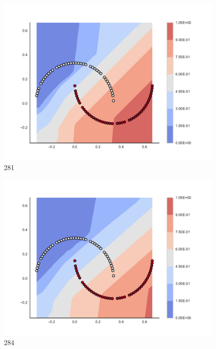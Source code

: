 \begin{subfigure}[b]{0.09\textwidth}
    \includegraphics[clip, trim=2.35cm 1.75cm 4.5cm 0cm,width=\textwidth]{img/convergence/281.pdf}
    \caption{281}
    \label{fig:convergence_281}
\end{subfigure}
%
\begin{subfigure}[b]{0.09\textwidth}
    \includegraphics[clip, trim=2.35cm 1.75cm 4.5cm 0cm,width=\textwidth]{img/convergence/284.pdf}
    \caption{284}
    \label{fig:convergence_284}
\end{subfigure}
%
